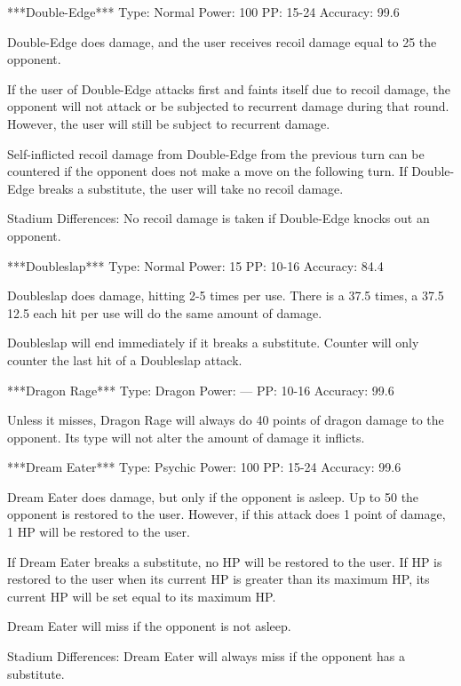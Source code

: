\documentclass[reprint, aps, prl, paper=A4]{revtex4-1}
\begin{document}
***Double-Edge***
Type: Normal
Power: 100
PP: 15-24
Accuracy: 99.6%

Double-Edge does damage, and the user receives recoil damage equal to 25%
the opponent.

If the user of Double-Edge attacks first and faints itself due to recoil damage, the opponent
will not attack or be subjected to recurrent damage during that round. However, the user will
still be subject to recurrent damage.

Self-inflicted recoil damage from Double-Edge from the previous turn can be countered if the
opponent does not make a move on the following turn. If Double-Edge breaks a substitute, the
user will take no recoil damage.

Stadium Differences:
No recoil damage is taken if Double-Edge knocks out an opponent.


***Doubleslap***
Type: Normal
Power: 15
PP: 10-16
Accuracy: 84.4%

Doubleslap does damage, hitting 2-5 times per use. There is a 37.5%
times, a 37.5%
12.5%
each hit per use will do the same amount of damage.

Doubleslap will end immediately if it breaks a substitute. Counter will only counter the last
hit of a Doubleslap attack.


***Dragon Rage***
Type: Dragon
Power: ---
PP: 10-16
Accuracy: 99.6%

Unless it misses, Dragon Rage will always do 40 points of dragon damage to the opponent. Its
type will not alter the amount of damage it inflicts.


***Dream Eater***
Type: Psychic
Power: 100
PP: 15-24
Accuracy: 99.6%

Dream Eater does damage, but only if the opponent is asleep. Up to 50%
the opponent is restored to the user. However, if this attack does 1 point of damage, 1 HP will
be restored to the user.

If Dream Eater breaks a substitute, no HP will be restored to the user. If HP is restored to
the user when its current HP is greater than its maximum HP, its current HP will be set equal
to its maximum HP.

Dream Eater will miss if the opponent is not asleep.

Stadium Differences:
Dream Eater will always miss if the opponent has a substitute.
\end{document}

